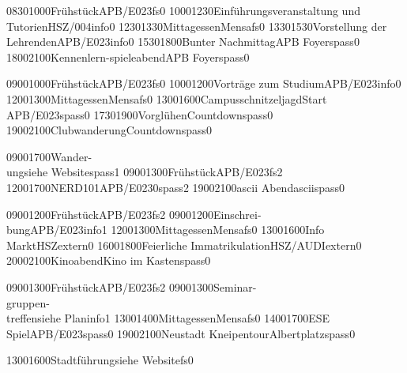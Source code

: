 \documentclass[a5paper,7pt]{scrreprt}
\begin{document}
\begin{center}
\begin{timetable}
   {0830}{1000}{Frühstück}{}{APB/E023}{}{fs}{0}
   {1000}{1230}{Einführungsveranstaltung und Tutorien}{}{HSZ/004}{}{info}{0}
   {1230}{1330}{Mittagessen}{}{Mensa}{}{fs}{0}
   {1330}{1530}{Vorstellung der Lehrenden}{}{APB/E023}{}{info}{0}
   {1530}{1800}{Bunter Nachmittag}{}{APB Foyer}{}{spass}{0}
   {1800}{2100}{Kennenlern-spieleabend}{}{APB Foyer}{}{spass}{0}

   {0900}{1000}{Frühstück}{}{APB/E023}{}{fs}{0}
   {1000}{1200}{Vorträge zum Studium}{}{APB/E023}{}{info}{0}
   {1200}{1300}{Mittagessen}{}{Mensa}{}{fs}{0}
   {1300}{1600}{Campusschnitzeljagd}{}{Start APB/E023}{}{spass}{0}
   {1730}{1900}{Vorglühen}{}{Countdown}{}{spass}{0}
   {1900}{2100}{Clubwanderung}{}{Countdown}{}{spass}{0}

   {0900}{1700}{Wander-\\ung}{}{siehe Website}{}{spass}{1}
   {0900}{1300}{Frühstück}{}{APB/E023}{}{fs}{2}
   {1200}{1700}{NERD101}{}{APB/E023}{0}{spass}{2}
   {1900}{2100}{ascii Abend}{}{ascii}{}{spass}{0}

   {0900}{1200}{Frühstück}{}{APB/E023}{}{fs}{2}
   {0900}{1200}{Einschrei-\\bung}{}{APB/E023}{}{info}{1}
   {1200}{1300}{Mittagessen}{}{Mensa}{}{fs}{0}
   {1300}{1600}{Info Markt}{}{HSZ}{}{extern}{0}
   {1600}{1800}{Feierliche Immatrikulation}{}{HSZ/AUDI}{}{extern}{0}
   {2000}{2100}{Kinoabend}{}{Kino im Kasten}{}{spass}{0}
  
   {0900}{1300}{Frühstück}{}{APB/E023}{}{fs}{2}
   {0900}{1300}{Seminar-\\gruppen-\\treffen}{}{siehe Plan}{}{info}{1}
   {1300}{1400}{Mittagessen}{}{Mensa}{}{fs}{0}
   {1400}{1700}{ESE Spiel}{}{APB/E023}{}{spass}{0}
   {1900}{2100}{Neustadt Kneipentour}{}{Albertplatz}{}{spass}{0}
  
   {1300}{1600}{Stadtführung}{}{siehe Website}{}{fs}{0}
\end{timetable}
\end{center}
\end{document}
